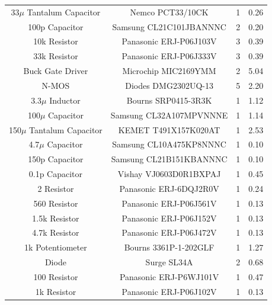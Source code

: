 \documentclass[12pt]{article}
\begin{document}
\begin{table}[!h]
{\begin{tabular}{ |c|c|c|c| }
 		33$\mu$ Tantalum Capacitor & Nemco PCT33/10CK & 1 & 0.26 \\
 		100p Capacitor & Samsung CL21C101JBANNNC & 2 & 0.20 \\
 		10k Resistor & Panasonic ERJ-P06J103V & 3 & 0.39 \\
 		33k Resistor & Panasonic ERJ-P06J333V & 3 & 0.39 \\
 		Buck Gate Driver & Microchip MIC2169YMM & 2 & 5.04 \\
 		N-MOS & Diodes DMG2302UQ-13 & 5 & 2.20 \\
 		3.3$\mu$ Inductor & Bourns SRP0415-3R3K & 1 & 1.12 \\
 		100$\mu$ Capacitor & Samsung CL32A107MPVNNNE & 1 & 1.14 \\
 		150$\mu$ Tantalum Capacitor & KEMET T491X157K020AT & 1 & 2.53 \\
 		4.7$\mu$ Capacitor & Samsung CL10A475KP8NNNC & 1 & 0.10 \\
 		150p Capacitor & Samsung CL21B151KBANNNC & 1 & 0.10 \\
 		0.1p Capacitor & Vishay VJ0603D0R1BXPAJ & 1 & 0.45 \\
 		2 Resistor & Panasonic ERJ-6DQJ2R0V & 1 & 0.24 \\
 		560 Resistor & Panasonic ERJ-P06J561V & 1 & 0.13 \\
 		1.5k Resistor & Panasonic ERJ-P06J152V & 1 & 0.13 \\
 		4.7k Resistor & Panasonic ERJ-P06J472V & 1 & 0.13 \\
 		1k Potentiometer & Bourns 3361P-1-202GLF & 1 & 1.27 \\
 		Diode & Surge SL34A & 2 & 0.68 \\
 		100 Resistor & Panasonic ERJ-P6WJ101V & 1 & 0.47 \\
 		1k Resistor & Panasonic ERJ-P06J102V & 1 & 0.13 \\
 		\hline
	\end{tabular}
	}
\end{table}
\end{document}
